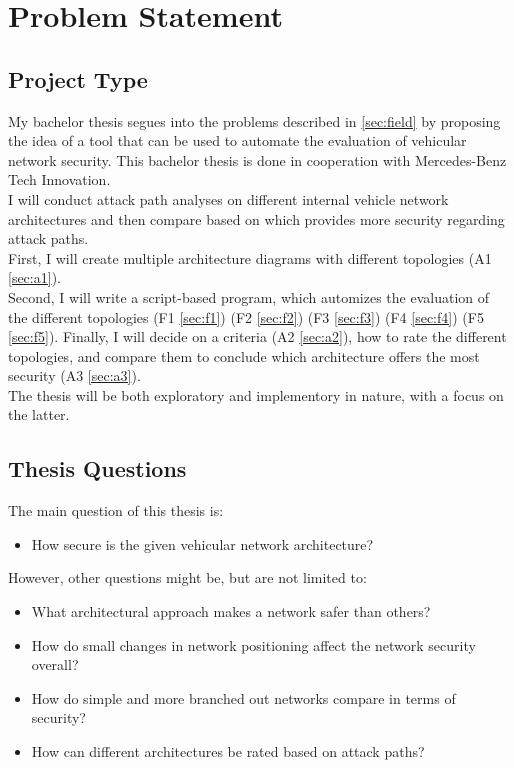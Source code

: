 
\chapter{Problem Statement}
\label{sec:problem}

\section{Project Type}\label{sec:type}

My bachelor thesis segues into the problems described in \ref{sec:field} by proposing the idea of a tool that can be used to automate the evaluation of vehicular network security.
This bachelor thesis is done in cooperation with Mercedes-Benz Tech Innovation.\\

I will conduct attack path analyses on different internal vehicle network architectures and then compare based on which provides more security regarding attack paths.\\

First, I will create multiple architecture diagrams with different topologies (A1 \ref{sec:a1}).\\
Second, I will write a script-based program, which automizes the evaluation of the different topologies 
(F1 \ref{sec:f1})
(F2 \ref{sec:f2})
(F3 \ref{sec:f3})
(F4 \ref{sec:f4})
(F5 \ref{sec:f5}).
Finally, I will decide on a criteria (A2 \ref{sec:a2}), how to rate the different topologies, and compare them to conclude which architecture offers the most security (A3 \ref{sec:a3}).\\

The thesis will be both exploratory and implementory in nature, with a focus on the latter.


\section{Thesis Questions}\label{sec:thesis-questions}

The main question of this thesis is:\\

\begin{itemize}
    \item How secure is the given vehicular network architecture?
\end{itemize}

However, other questions might be, but are not limited to:\\

\begin{itemize}
    \item What architectural approach makes a network safer than others?
    \item How do small changes in network positioning affect the network security overall?
    \item How do simple and more branched out networks compare in terms of security?
    \item How can different architectures be rated based on attack paths?
\end{itemize}



